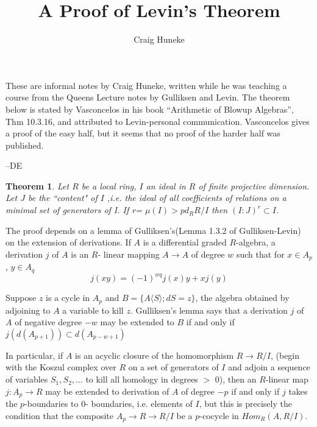 \documentclass[11pt, oneside]{article}   	%
\title{A Proof of Levin's Theorem}
\author{Craig Huneke}
\newtheorem{Theorem}{Theorem}
\begin{document}
\maketitle

These are informal notes by Craig Huneke, written while he was teaching a course from
the Queens Lecture notes by Gulliksen and Levin. The theorem below is stated by
Vasconcelos in his book ``Arithmetic of Blowup Algebras'', Thm 10.3.16, and attributed to 
Levin-personal communication. Vasconcelos gives a proof of the easy half,
but it seems that no proof of the harder half was published.

	--DE

\begin{Theorem} 
 Let $R$ be a local ring, $I$ an ideal in $R$ of finite projective
dimension. Let
$J$ be the ``content" of $I$ ,i.e. the ideal of all coefficients of relations
on a minimal set of generators of I. If r= $\mu(I) > pd_RR/I $ then
$(I:J)^r \subset I$.
\end{Theorem}

The proof depends on a lemma of Gulliksen's(Lemma 1.3.2 of Gulliksen-Levin)
on the extension of derivations.
If $A$ is a differential graded $R$-algebra,  a derivation $j$ of $A$ is an $R$-
linear mapping  $A \to A$ of degree $w$ such that for $x \in A_p$ , $y \in
A_q$
$$ j(xy)=(-1)^{wq}j(x)y + xj(y) $$

    Suppose $z$ is a cycle in $A_p$ and $B = \{ A\langle S \rangle ; dS =
z\}$, the algebra obtained by adjoining to $A$ a variable to kill $z$.
Gulliksen's lemma says that a derivation $j$ of $A$ of negative degree $-w$ may
be
extended   to $B$ if
and only if $j(d(A_{p+1})) \subset d(A_{p-w+1}) $

  In particular, if $A$ is an acyclic closure of the homomorphism $R \to R/I$,
(begin with the Koszul complex over $R$ on a set of generators of $I$ and
adjoin a sequence of variables $S_1,S_2,\ldots $ to kill all homology in
degrees $>$ 0), then an $R$-linear map $j:A_p \to R$ may be extended to derivation
of $A$ of degree $-p$ if and only if $j$ takes the $p$-boundaries to 0-
boundaries, i.e. elements of $I$, but this is precisely the condition that the
composite $A_p \to R \to R/I $ be a $p$-cocycle in $Hom_R(A,R/I)$. 
\end{document}
